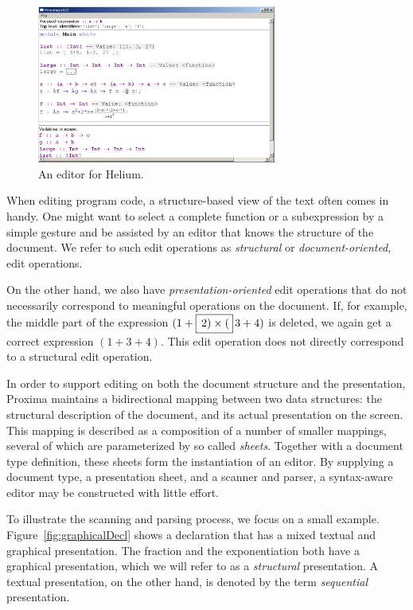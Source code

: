 \documentclass[12pt]{article}
\begin{document}
\begin{figure}[ht]
\centering
\includegraphics[width=0.7\textwidth]{images/HeliumEditor}
\caption{An editor for Helium.}
\label{fig:heliumEditor}
\end{figure}


When editing program code, a structure-based view of the text often comes in handy. One might want to select a complete  function or a subexpression by a simple gesture and be assisted by an editor that knows the structure of the document. We refer to such edit operations as {\em structural} or {\em document-oriented}, edit operations.

On the other hand, we also have {\em presentation-oriented} edit operations that do not necessarily correspond to meaningful operations on the document. If, for example, the middle part of the expression $(1+\framebox{$\,2) \times ($}\,3+4)$ is deleted, we again get a correct expression $(1+3+4)$. This edit operation does not directly correspond to a structural edit operation.


In order to support editing on both the document structure and the presentation, Proxima maintains a bidirectional mapping between two data structures: the structural description of the document, and its actual presentation on the screen. This mapping is described as a composition of a number of smaller mappings, several of which are parameterized by so called {\em sheets}. Together with a document type definition, these sheets form the instantiation of an editor. By supplying a document type, a presentation sheet, and a scanner and parser, a syntax-aware editor may be constructed with little effort.



To illustrate the scanning and parsing process, we focus on a small example. Figure~\ref{fig:graphicalDecl} shows a declaration that has a mixed textual and graphical presentation. The fraction and the exponentiation both have a graphical presentation, which we will refer to as a {\em structural} presentation. A textual presentation, on the other hand, is denoted by the term {\em sequential} presentation. 
\end{document}
